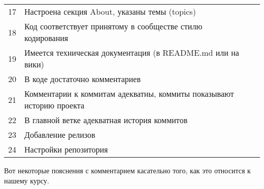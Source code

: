 \documentclass{../../text-style}
\begin{document}
\begin{tabu} {| X[0.1 l p] | X[2 l p] | X[0.1 l p] |}
    17 & Настроена секция About, указаны темы (topics)                              & \\
    18 & Код соответствует принятому в сообществе стилю кодирования                 & \\
    19 & Имеется техническая документация (в README.md или на вики)                 & \\
    20 & В коде достаточно комментариев                                             & \\
    21 & Комментарии к коммитам адекватны, коммиты показывают историю проекта       & \\
    22 & В главной ветке адекватная история коммитов                                & \\
    23 & Добавление релизов                                                         & \\
    24 & Настройки репозитория                                                      & \\
\end{tabu}

Вот некоторые пояснения с комментарием касательно того, как это относится к нашему курсу.
\end{document}
